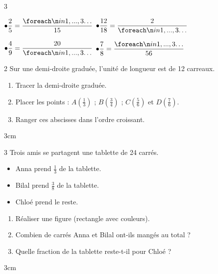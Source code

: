 \documentclass[a4paper]{book}
\begin{document}
{\begin{exerciceNote}{3}
\begin{minipage}[t]{0.46\textwidth}
            \bigskip
            
            $\bullet \dfrac{2}{5} = \dfrac{\points[3]}{15}$ \hspace{1.2cm} $\bullet \dfrac{12}{18} = \dfrac{2}{\points[3]}$
            
            \bigskip
            
            $\bullet \dfrac{4}{9} = \dfrac{20}{\points[3]}$ \hspace{1.2cm} $\bullet \dfrac{7}{8} = \dfrac{\points[3]}{56}$
        \end{minipage}
    \end{exerciceNote}
        
    \begin{exerciceNote}{2}
        Sur une demi-droite graduée, l'unité de longueur est de 12 carreaux.
        \begin{enumerate}
            \item Tracer la demi-droite graduée.
            \item Placer les points : $A\left(\frac{1}{3}\right)$ ; $B\left(\frac{3}{4}\right)$ ; $C\left(\frac{5}{6}\right)$ et $D\left(\frac{7}{6}\right)$.
            \item Ranger ces abscisses dans l'ordre croissant.
        \end{enumerate}
        \begin{ZoneReponse}{3cm} \end{ZoneReponse}
    \end{exerciceNote}
        
    \begin{exerciceNote}{3}
        Trois amis se partagent une tablette de 24 carrés.
        \begin{itemize}
            \item Anna prend $\frac{1}{3}$ de la tablette.
            \item Bilal prend $\frac{3}{8}$ de la tablette.
            \item Chloé prend le reste.
        \end{itemize}
        \begin{enumerate}
            \item Réaliser une figure (rectangle avec couleurs).
            \item Combien de carrés Anna et Bilal ont-ils mangés au total ?
            \item Quelle fraction de la tablette reste-t-il pour Chloé ? 
        \end{enumerate}
        \begin{ZoneReponse}{3cm} \end{ZoneReponse}
    \end{exerciceNote} 
    
}
\end{document}
